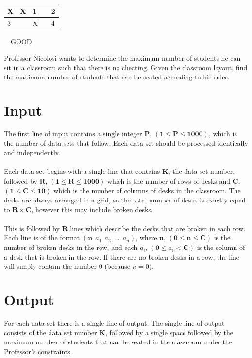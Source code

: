 \documentclass[11pt]{article}
\begin{document}
\begin{center}
\setlength{\tabcolsep}{8pt}
\renewcommand{\arraystretch}{1.5}
\begin{tabular}{ | m{6pt} | m{6pt} | m{6pt} | m{6pt} | m{6pt} | }
		\hline
 		X & X & 1 & & 2 \\ \hline
		3 & & X & & 4 \\
 		\hline
\end{tabular}\ \ GOOD
\end{center}
\bigskip
Professor Nicolosi wants to determine the maximum number of students he can sit
in a classroom such that there is no cheating. Given the classroom layout,
find the maximum number of students that can be seated according to his rules.

\section{Input}
The first line of input contains a single integer $\boldsymbol{P}$, $(\boldsymbol{1} \le \boldsymbol{P} \le \boldsymbol{1000})$, which is the number of data sets that follow. Each
data set should be processed identically and independently.
\\\\
Each data set begins with a single line that contains $\boldsymbol{K}$, the data
set number, followed by $\boldsymbol{R}$, $(\boldsymbol{1} \le \boldsymbol{R} \le \boldsymbol{1000})$ which
is the number of rows of desks and $\boldsymbol{C}$,
$(\boldsymbol{1} \le \boldsymbol{C} \le \boldsymbol{10})$
which is the number of columns of desks in the classroom. The desks are always
arranged in a grid, so the total number of desks is exactly equal to
$\boldsymbol{R} \times \boldsymbol{C}$, however this may include broken desks.
\\\\
This is followed by $\boldsymbol{R}$ lines which describe the desks that are
broken in each row. Each line is of the format $(\boldsymbol{n}\ \ a_1\ \ a_2\ \ \ldots\ \ a_n)$,
where $\boldsymbol{n}$, $(\boldsymbol{0} \le \boldsymbol{n} \le \boldsymbol{C})$
is the number of broken desks in the row, and each $a_i$,
$(\boldsymbol{0} \le a_i < \boldsymbol{C})$ is the column of
a desk that is broken in the row. If there are no broken desks in a row, the
line will simply contain the number $0$ (because $n = 0$).

\section{Output}
For each data set there is a single line of output. The single line of output
consists of the data set number $\boldsymbol{K}$, followed by a single space
followed by the maximum number of students that can be seated in the classroom
under the Professor's constraints.
\end{document}
